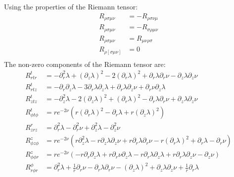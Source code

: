 \documentclass{article}
\begin{document}
Using the properties of the Riemann tensor:
\begin{equation}
\begin{aligned}
R_{\rho\sigma\mu\nu}&=-R_{\rho\sigma\nu\mu}\\
R_{\rho\sigma\mu\nu}&=-R_{\sigma\rho\mu\nu}\\
R_{\rho\sigma\mu\nu}&=R_{\mu\nu\rho\sigma}\\
R_{\rho[\sigma\mu\nu]}&=0\\
\end{aligned}
\end{equation}
The non-zero components of the Riemann tensor are:
\begin{equation}
\begin{aligned}
R^{t}_{rtr}&=-\partial^{2}_{r}\lambda+\left(\partial_{z}\lambda\right)^{2}-2\left(\partial_{r}\lambda\right)^{2}+\partial_{r}\lambda\partial_{r}\nu-\partial_{z}\lambda\partial_{z}\nu\\
R^{t}_{rtz}&=-\partial_{r}\partial_{z}\lambda-3\partial_{r}\lambda\partial_{z}\lambda+\partial_{r}\lambda\partial_{z}\nu+\partial_{r}\nu\partial_{z}\lambda\\
R^{t}_{ztz}&=-\partial^{2}_{z}\lambda-2\left(\partial_{z}\lambda\right)^{2}+\left(\partial_{r}\lambda\right)^{2}-\partial_{r}\lambda\partial_{r}\nu+\partial_{z}\lambda\partial_{z}\nu\\
R^{t}_{\phi t\phi}&=re^{-2\nu}\left(r\left(\partial_{r}\lambda\right)^{2}-\partial_{r}\lambda+r\left(\partial_{z}\lambda\right)^{2}\right)\\
R^{r}_{zrz}&=\partial^{2}_{r}\lambda-\partial^{2}_{r}\nu+\partial^{2}_{z}\lambda-\partial^{2}_{z}\nu\\
R^{z}_{\phi z\phi}&=re^{-2\nu}\left(r\partial^{2}_{z}\lambda-r\partial_{z}\lambda\partial_{z}\nu+r\partial_{r}\lambda\partial_{r}\nu-r\left(\partial_{r}\lambda\right)^{2}+\partial_{r}\lambda-\partial_{r}\nu\right)\\
R^{z}_{\phi\phi r}&=re^{-2\nu}\left(-r\partial_{r}\partial_{z}\lambda+r\partial_{r}\nu\partial_{z}\lambda-r\partial_{r}\lambda\partial_{z}\lambda+r\partial_{r}\lambda\partial_{z}\nu-\partial_{z}\nu\right)\\
R^{\phi}_{r\phi r}&=\partial^{2}_{r}\lambda+\frac{1}{r}\partial_{r}\nu-\partial_{r}\lambda\partial_{r}\nu-\left(\partial_{z}\lambda\right)^{2}+\partial_{z}\lambda\partial_{z}\nu+\frac{1}{r}\partial_{r}\lambda\\
\end{aligned}
\end{equation}
\end{document}
